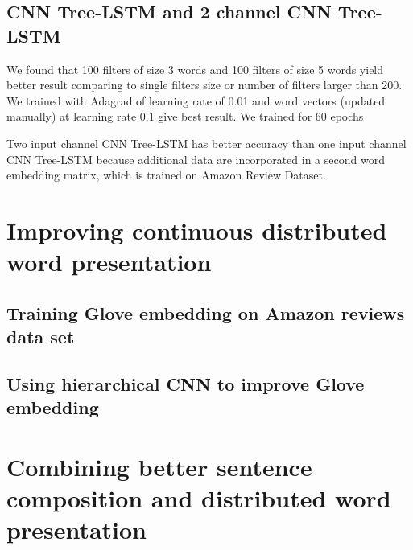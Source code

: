 \subsection{CNN Tree-LSTM and 2 channel CNN Tree-LSTM}
We found that 100 filters of size 3 words and 100 filters of size 5 words yield better result comparing to single filters size or number of filters larger than 200. We trained with Adagrad of learning rate of 0.01 and word vectors (updated manually) at learning rate 0.1 give best result. We trained for 60 epochs

Two input channel CNN Tree-LSTM has better accuracy than one input channel CNN Tree-LSTM because additional data are incorporated in a second word embedding matrix, which is trained on Amazon Review Dataset.









\section{Improving continuous distributed word presentation}

\subsection{Training Glove embedding on Amazon reviews data set}

\subsection{Using hierarchical CNN to improve Glove embedding}


\section{Combining better sentence composition and distributed word presentation}
